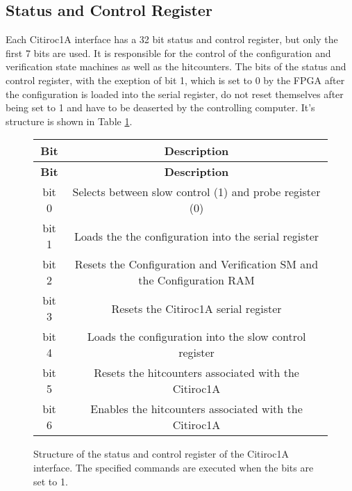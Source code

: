 \subsection{Status and Control Register}
Each Citiroc1A interface has a 32 bit status and control register, but only the first 7 bits are used.
 It is responsible for the control of the configuration and verification state machines as well as the hitcounters.
 The bits of the status and control register, with the exeption of bit 1, which is set to 0 by the FPGA after the configuration is loaded into the serial register,
do not reset themselves after being set to 1 and have to be deaserted by the controlling computer.
\newline
It's structure is shown in Table \ref{tab:status_control_register}.
\begin{figure}  
    \centering
\begin{longtable}{|c|c|}
    \hline
    \textbf{Bit} & \textbf{Description} \\
    \hline
    \endfirsthead
    
    \hline
    \textbf{Bit} & \textbf{Description} \\
    \hline
    \endhead
    
    \hline
    \endfoot
    
    \hline
    \endlastfoot
    bit 0 & Selects between slow control (1) and probe register (0) \\
    bit 1 & Loads the the configuration into the serial register\\
    bit 2 & Resets the Configuration and Verification SM and the Configuration RAM \\
    bit 3 & Resets the  Citiroc1A serial register \\
    bit 4 & Loads the configuration into the slow control register \\
    bit 5 & Resets the hitcounters associated with the Citiroc1A \\
    bit 6 & Enables the hitcounters associated with the Citiroc1A \\
    \hline
    \end{longtable}
    \caption{Structure of the status and control register of the Citiroc1A interface. 
    The specified commands are executed when the bits are set to 1. }  
    \label{tab:status_control_register}
\end{figure}  
  
